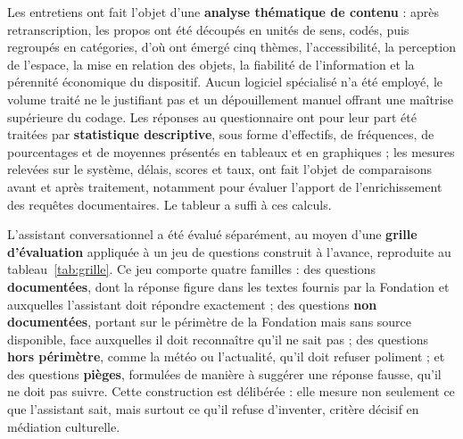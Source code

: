 Les entretiens ont fait l'objet d'une \textbf{analyse thématique de contenu} :
après retranscription, les propos ont été découpés en unités de sens, codés,
puis regroupés en catégories, d'où ont émergé cinq thèmes, l'accessibilité, la
perception de l'espace, la mise en relation des objets, la fiabilité de
l'information et la pérennité économique du dispositif. Aucun logiciel
spécialisé n'a été employé, le volume traité ne le justifiant pas et un
dépouillement manuel offrant une maîtrise supérieure du codage. Les réponses au
questionnaire ont pour leur part été traitées par \textbf{statistique
descriptive}, sous forme d'effectifs, de fréquences, de pourcentages et de
moyennes présentés en tableaux et en graphiques ; les mesures relevées sur le
système, délais, scores et taux, ont fait l'objet de comparaisons avant et après
traitement, notamment pour évaluer l'apport de l'enrichissement des requêtes
documentaires. Le tableur a suffi à ces calculs.

L'assistant conversationnel a été évalué séparément, au moyen d'une
\textbf{grille d'évaluation} appliquée à un jeu de questions construit à
l'avance, reproduite au tableau~\ref{tab:grille}. Ce jeu comporte quatre familles : des
questions \textbf{documentées}, dont la réponse figure dans les textes fournis
par la Fondation et auxquelles l'assistant doit répondre exactement ; des
questions \textbf{non documentées}, portant sur le périmètre de la Fondation
mais sans source disponible, face auxquelles il doit reconnaître qu'il ne sait
pas ; des questions \textbf{hors périmètre}, comme la météo ou l'actualité,
qu'il doit refuser poliment ; et des questions \textbf{pièges}, formulées de
manière à suggérer une réponse fausse, qu'il ne doit pas suivre. Cette
construction est délibérée : elle mesure non seulement ce que l'assistant sait,
mais surtout ce qu'il refuse d'inventer, critère décisif en médiation
culturelle.

